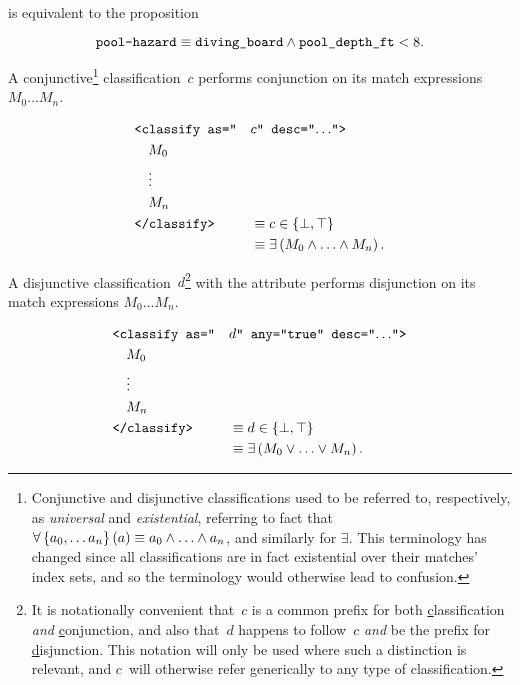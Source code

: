\noindent
is equivalent to the proposition

\begin{equation*}
  \texttt{pool-hazard} \equiv \texttt{diving\_board}
    \wedge \texttt{pool\_depth\_ft} < 8.
\end{equation*}

\goodbreak
{}
\begin{definition}
  A conjunctive\footnote{%
    Conjunctive and disjunctive classifications used to be referred to,
      respectively,
      as \emph{universal} and \emph{existential},
        referring to fact that
          $\forall\left\{a_0,\ldots a_n\right\}(a) \equiv a_0\wedge\ldots\wedge a_n$,
            and similarly for $\exists$.
    This terminology has changed since all classifications are in fact
      existential over their matches' index sets,
        and so the terminology would otherwise lead to confusion.
    }
    classification~$c$ performs conjunction on its match expressions
      $M_0\ldots M_n$.

  \begin{alignat*}{2}
    &\texttt{<classify as="}&&c\texttt{" desc="$\ldots$">} \\
    &\quad M_0 \\
    &\quad \vdots \\
    &\quad M_n \\
    &\texttt{</classify>}
      &&\equiv c\in\{\bot,\top\} \\
    & &&\equiv \exists\left( M_0 \wedge \ldots \wedge M_n \right).
  \end{alignat*}
\end{definition}

\begin{definition}
  A disjunctive classification~$d$\footnote{%
    It is notationally convenient that~$c$ is a common prefix for both
      \underline{c}lassification \emph{and} \underline{c}onjunction,
        and also that~$d$ happens to follow~$c$ \emph{and} be the prefix for
        \underline{d}isjunction.
    This notation will only be used where such a distinction is relevant,
      and $c$~will otherwise refer generically to any type of
      classification.}
    with the attribute  performs disjunction on its match
      expressions $M_0\ldots M_n$.

  \begin{alignat*}{2}
    &\texttt{<classify as="} &&d\texttt{" any="true" desc="$\ldots$">} \\
    &\quad M_0 \\
    &\quad \vdots \\
    &\quad M_n \\
    &\texttt{</classify>}
      &&\equiv d\in\{\bot,\top\} \\
    & &&\equiv \exists\left( M_0 \vee \ldots \vee M_n \right).
  \end{alignat*}
\end{definition}



